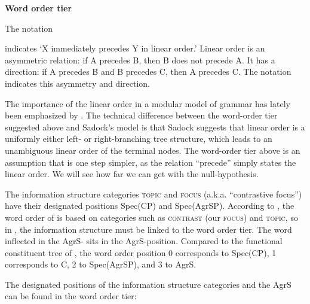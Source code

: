 \documentclass[output=paper]{langsci/langscibook}
\begin{document}
\ea
\textbf{Word order tier}

\z

The notation  indicates ‘X immediately precedes Y in linear order.’ Linear order is an asymmetric relation: if A precedes B, then B does not precede A. It has a direction: if A precedes B and B precedes C, then A precedes C. The notation indicates this asymmetry and direction.


The importance of the linear order in a modular model of grammar has lately been emphasized by \citet[111--113]{Sadock2012}. The technical difference between the word-order tier suggested above and Sadock’s model is that Sadock suggests that linear order is a uniformly either left- or right-branching tree structure, which leads to an unambiguous linear order of the terminal nodes. The word-order tier above is an assumption that is one step simpler, as the relation “precede” simply states the linear order. We will see how far we can get with the null-hypothesis.

The information structure categories \textsc{topic} and \textsc{focus} (a.k.a. “contrastive focus”) have their designated positions Spec(CP) and Spec(AgrSP). According to \citet{Vilkuna1989}, the word order of  is based on categories such as \textsc{contrast} (our \textsc{focus}) and \textsc{topic}, so in , the information structure must be linked to the word order tier. The word inflected in the AgrS- sits in the AgrS-position. Compared to the functional constituent tree of \citet{HolmbergEtAl1993}, the word order position 0 corresponds to Spec(CP), 1 corresponds to C, 2 to Spec(AgrSP), and 3 to AgrS. 

The designated positions of the information structure categories and the AgrS can be found in the word order tier:
\end{document}
